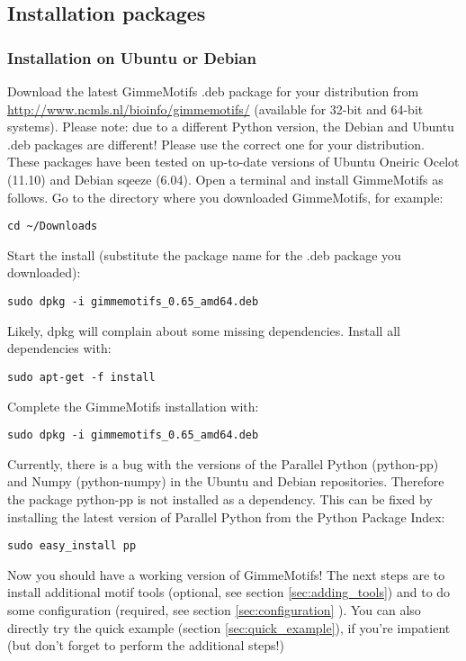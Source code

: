 \documentclass[11pt]{article}
\begin{document}
\subsection{Installation packages}
\subsubsection{Installation on Ubuntu or Debian}
Download the latest GimmeMotifs .deb package for your distribution  from \url{http://www.ncmls.nl/bioinfo/gimmemotifs/} (available for 32-bit and 64-bit systems). Please note: due to a different Python version, the Debian and Ubuntu .deb packages are different! Please use the correct one for your distribution.
These packages have been tested on up-to-date versions of Ubuntu Oneiric Ocelot (11.10) and Debian sqeeze (6.04). 
Open a terminal and install GimmeMotifs as follows. Go to the directory where you downloaded GimmeMotifs, for example:
\begin{verbatim}
cd ~/Downloads
\end{verbatim}
Start the install (substitute the package name for the .deb package you downloaded):
\begin{verbatim}
sudo dpkg -i gimmemotifs_0.65_amd64.deb 
\end{verbatim}
Likely, dpkg will complain about some missing dependencies. Install all dependencies with:
\begin{verbatim}
sudo apt-get -f install
\end{verbatim}
Complete the GimmeMotifs installation with:
\begin{verbatim}
sudo dpkg -i gimmemotifs_0.65_amd64.deb 
\end{verbatim}
Currently, there is a bug with the versions of the Parallel Python (python-pp) and Numpy (python-numpy) in the Ubuntu and Debian repositories. Therefore the package python-pp is not installed as a dependency. This can be fixed by installing the latest version of Parallel Python from the Python Package Index:
\begin{verbatim}
sudo easy_install pp 
\end{verbatim}
Now you should have a working version of GimmeMotifs! The next steps are to install additional motif tools (optional, see section \ref{sec:adding_tools}) and to do some configuration (required, see section \ref{sec:configuration} ). You can also directly try the quick example (section \ref{sec:quick_example}), if you're impatient (but don't forget to perform the additional steps!)
\end{document}
